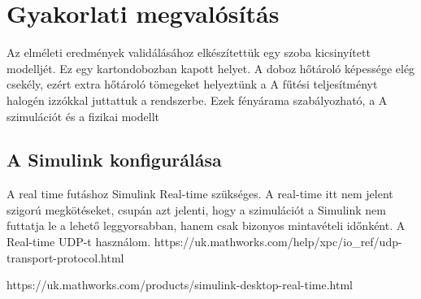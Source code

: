 \chapter{Gyakorlati megvalósítás}

Az elméleti eredmények validálásához elkészítettük egy szoba kicsinyített modelljét. Ez egy kartondobozban kapott helyet. A doboz hőtároló képessége elég csekély, ezért extra hőtároló tömegeket helyeztünk a 
A fűtési teljesítményt halogén izzókkal juttattuk a rendszerbe. Ezek fényárama szabályozható, a 
A szimulációt és a fizikai modellt

\section{A Simulink konfigurálása}
A real time futáshoz Simulink  Real-time szükséges. A real-time itt nem jelent szigorú megkötéseket, csupán azt jelenti, hogy a szimulációt a Simulink nem futtatja le a lehető leggyorsabban, hanem csak bizonyos mintavételi időnként. A Real-time UDP-t használom. https://uk.mathworks.com/help/xpc/io_ref/udp-transport-protocol.html

https://uk.mathworks.com/products/simulink-desktop-real-time.html